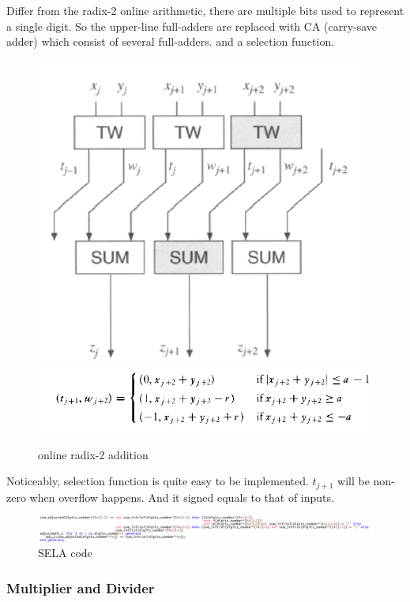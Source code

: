 \documentclass[10pt]{article}
\begin{document}
Differ from the radix-2 online arithmetic, there are multiple bits used to represent a single digit. So the upper-line  full-adders are replaced with CA (carry-save adder) which consist of several full-adders. and a selection function.   
        \begin{figure}[H]
       \centering
       \includegraphics[scale=0.75]{adder_structure.png}
       \includegraphics[scale=0.75]{SELA.png}
       \caption{online radix-2 addition \cite{c2}}
    \end{figure}
    
Noticeably, selection function is quite easy to be implemented. $t_{j+1}$ will be non-zero when overflow happens. And it signed equals to that of inputs.

        \begin{figure}[H]
       \centering
       \includegraphics[width = 1\textwidth]{code_SELA.PNG}
       \caption{SELA code}
    \end{figure}
\subsubsection{Multiplier and Divider}
\end{document}
